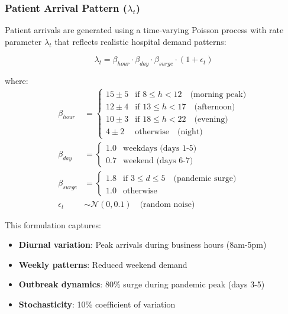 \documentclass[12pt,a4paper]{article}
\begin{document}
	\subsubsection{Patient Arrival Pattern ($\lambda_t$)}
	
	Patient arrivals are generated using a time-varying Poisson process with rate parameter $\lambda_t$ that reflects realistic hospital demand patterns:
	
	\begin{equation}
		\lambda_t = \beta_{hour} \cdot \beta_{day} \cdot \beta_{surge} \cdot (1 + \epsilon_t)
	\end{equation}
	
	where:
	\begin{align*}
		\beta_{hour} &= \begin{cases}
			15 \pm 5 & \text{if } 8 \leq h < 12 \quad \text{(morning peak)} \\
			12 \pm 4 & \text{if } 13 \leq h < 17 \quad \text{(afternoon)} \\
			10 \pm 3 & \text{if } 18 \leq h < 22 \quad \text{(evening)} \\
			4 \pm 2 & \text{otherwise} \quad \text{(night)}
		\end{cases} \\
		\beta_{day} &= \begin{cases}
			1.0 & \text{weekdays (days 1-5)} \\
			0.7 & \text{weekend (days 6-7)}
		\end{cases} \\
		\beta_{surge} &= \begin{cases}
			1.8 & \text{if } 3 \leq d \leq 5 \quad \text{(pandemic surge)} \\
			1.0 & \text{otherwise}
		\end{cases} \\
		\epsilon_t &\sim \mathcal{N}(0, 0.1) \quad \text{(random noise)}
	\end{align*}
	
	This formulation captures:
	\begin{itemize}
		\item \textbf{Diurnal variation}: Peak arrivals during business hours (8am-5pm)
		\item \textbf{Weekly patterns}: Reduced weekend demand
		\item \textbf{Outbreak dynamics}: 80\% surge during pandemic peak (days 3-5)
		\item \textbf{Stochasticity}: 10\% coefficient of variation
	\end{itemize}
	
\end{document}
